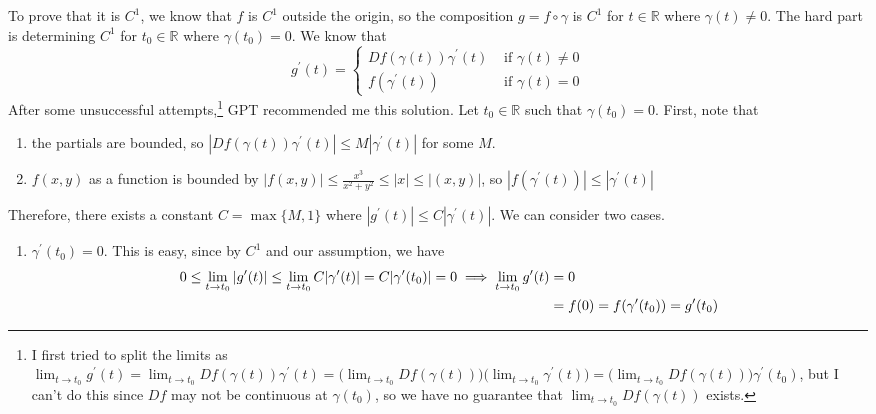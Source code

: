 \begin{solution}
\begin{enumerate}
				To prove that it is $C^1$, we know that $f$ is $C^1$ outside the origin, so the composition $g = f \circ \gamma$ is $C^1$ for $t \in \mathbb{R}$ where $\gamma(t) \neq 0$. The hard part is determining $C^1$ for $t_0 \in \mathbb{R}$ where $\gamma(t_0) = 0$. We know that 
				\begin{equation}
					g^\prime (t) = \begin{cases} 
						Df(\gamma(t)) \gamma^\prime (t) & \text{ if } \gamma(t) \neq 0 \\ 
						f(\gamma^\prime(t)) & \text{ if } \gamma(t) = 0
					\end{cases}
				\end{equation} 
				After some unsuccessful attempts,\footnote{I first tried to split the limits as $\lim_{t \to t_0} g^\prime (t) = \lim_{t \to t_0} Df(\gamma(t)) \gamma^\prime(t) = \big( \lim_{t \to t_0} Df(\gamma(t)) \big) \big( \lim_{t \to t_0} \gamma^\prime(t) \big) = \big( \lim_{t \to t_0} Df(\gamma(t)) \big) \gamma^\prime(t_0)$, but I can't do this since $Df$ may not be continuous at $\gamma(t_0)$, so we have no guarantee that $\lim_{t \to t_0} Df(\gamma(t))$ exists.} GPT recommended me this solution. Let $t_0 \in \mathbb{R}$ such that $\gamma(t_0) = 0$. First, note that 
				\begin{enumerate}
				  \item the partials are bounded, so $|Df(\gamma(t)) \gamma^\prime (t)| \leq M |\gamma^\prime (t)|$ for some $M$. 
					\item $f(x, y)$ as a function is bounded by $|f(x, y)| \leq \frac{x^3}{x^2 + y^2} \leq |x| \leq |(x, y)|$, so $|f(\gamma^\prime (t))| \leq |\gamma^\prime (t)|$
				\end{enumerate}
				Therefore, there exists a constant $C = \max\{M, 1\}$ where $|g^\prime (t)| \leq C |\gamma^\prime (t)|$. We can consider two cases. 
				\begin{enumerate}
				  \item $\gamma^\prime(t_0) = 0$. This is easy, since by $C^1$ and our assumption, we have
						\begin{align}
							0 \leq \lim_{t \to t_0} |g^\prime (t)| \leq \lim_{t \to t_0} C |\gamma^\prime (t)| = C |\gamma^\prime (t_0)| = 0 \implies \lim_{t \to t_0} g^\prime (t) & = 0 \notag \\ 
							& = f(0) = f(\gamma^\prime (t_0)) = g^\prime (t_0)
						\end{align} 


\end{enumerate}
\end{enumerate}
\end{solution}
